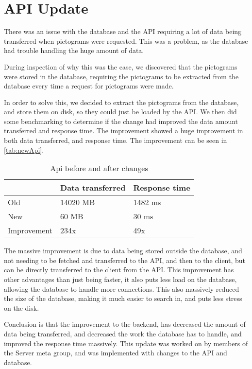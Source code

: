 \section{API Update}
There was an issue with the database and the API requiring a lot of data being transferred when pictograms were requested. 
This was a problem, as the database had trouble handling the huge amount of data. 

During inspection of why this was the case, we discovered that the pictograms were stored in the database, requiring the pictograms to be extracted from the database every time a request for pictograms were made. 

In order to solve this, we decided to extract the pictograms from the database, and store them on disk, so they could just be loaded by the API. 
We then did some benchmarking to determine if the change had improved the data amount transferred and response time. 
The improvement showed a huge improvement in both data transferred, and response time. 
The improvement can be seen in \autoref{tab:newApi}.

\begin{table}[H]
    \centering
    \begin{tabular}{|l|l|l|}
    \hline
                    & Data transferred  & Response time \\ \hline
        Old         & 14020 MB          & 1482 ms       \\ \hline 
        New         & 60 MB             & 30 ms         \\ \hline
        Improvement & 234x              & 49x           \\ \hline
    \end{tabular}
    \caption{Api before and after changes}
    \label{tab:newApi}
\end{table}

The massive improvement is due to data being stored outside the database, and not needing to be fetched and transferred to the API, and then to the client, but can be directly transferred to the client from the API. 
This improvement has other advantages than just being faster, it also puts less load on the database, allowing the database to handle more connections. 
This also massively reduced the size of the database, making it much easier to search in, and puts less stress on the disk.

Conclusion is that the improvement to the backend, has decreased the amount of data being transferred, and decreased the work the database has to handle, and improved the response time massively. 
This update was worked on by members of the Server meta group, and was implemented with changes to the API and database. 
